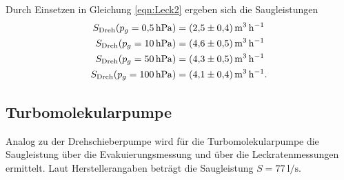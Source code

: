 \noindent
Durch Einsetzen in Gleichung \ref{eqn:Leck2} ergeben sich die Saugleistungen
\begin{align*}
  S_\text{Dreh}(p_g=\SI{0.5}{\hecto\pascal})&=\SI[per-mode=reciprocal]{2.5 \pm 0.4}{\cubic\metre\per\hour}\\
  S_\text{Dreh}(p_g=\SI{10}{\hecto\pascal})&=\SI[per-mode=reciprocal]{4.6 \pm 0.5}{\cubic\metre\per\hour}\\
  S_\text{Dreh}(p_g=\SI{50}{\hecto\pascal})&=\SI[per-mode=reciprocal]{4.3 \pm 0.5}{\cubic\metre\per\hour}\\
  S_\text{Dreh}(p_g=\SI{100}{\hecto\pascal})&=\SI[per-mode=reciprocal]{4.1 \pm 0.4}{\cubic\metre\per\hour}.
\end{align*}
\subsection{Turbomolekularpumpe}
Analog zu der Drehschieberpumpe wird für die Turbomolekularpumpe die Saugleistung über die 
Evakuierungsmessung und über die Leckratenmessungen ermittelt. Laut Herstellerangaben
beträgt die Saugleistung $S=\SI{77}{\litre\per\second}$.
